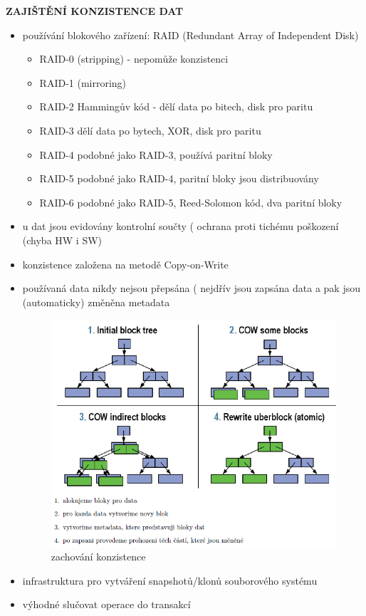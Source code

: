 \documentclass[10pt,a4paper]{article}
\begin{document}
\textbf{ZAJIŠTĚNÍ KONZISTENCE DAT}
\begin{itemize}
	\item používání blokového zařízení: RAID (Redundant Array of Independent Disk)
	\begin{itemize}
		\item RAID-0 (stripping) - nepomůže konzistenci
		\item RAID-1 (mirroring)
		\item RAID-2 Hammingův kód - dělí data po bitech, disk pro paritu
		\item RAID-3 dělí data po bytech, XOR, disk pro paritu
		\item RAID-4 podobné jako RAID-3, používá paritní bloky
		\item RAID-5 podobné jako RAID-4, paritní bloky jsou distribuovány
		\item RAID-6 podobné jako RAID-5, Reed-Solomon kód, dva paritní bloky
	\end{itemize}
	\item u dat jsou evidovány kontrolní součty ( ochrana proti tichému poškození (chyba HW i SW)
	\item konzistence založena na metodě Copy-on-Write
	\item používaná data nikdy nejsou přepsána ( nejdřív jsou zapsána data a pak jsou (automaticky)
změněna metadata
	\begin{figure} [h]
		\includegraphics[scale=0.8]{img/konzistence.png}
		\caption{zachování konzistence}	
	\end{figure}
	\item infrastruktura pro vytváření snapshotů/klonů souborového systému
	\item výhodné slučovat operace do transakcí
\end{itemize}
\end{document}
